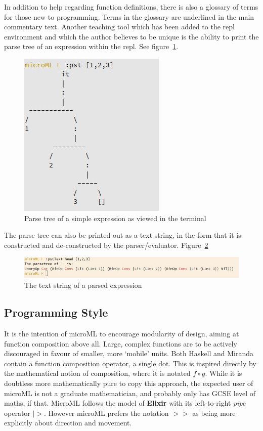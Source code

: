 \documentclass[12pt, a4paper]{report}
\begin{document}
In addition to help regarding function definitions, there is also a glossary of terms for those new
to programming. Terms in the glossary are underlined in the main commentary text.  Another teaching 
tool which has been added to the repl environment and which the author believes to be unique
is the ability to print the parse tree of an expression within the repl. See figure~\ref{fig:tree}.

\begin{figure}
    \includegraphics[scale=0.6]{images/tree.jpg}
    {\caption{Parse tree of a simple expression as viewed in the terminal}}
\label{fig:tree}
\end{figure}

The parse tree can also be printed out as a text string, in the form that it is constructed and
de-constructed by the parser/evaluator. Figure~\ref{fig:parsetext}

\begin{figure}
    \includegraphics[width=\textwidth]{images/parsetext.jpg}
    {\caption{The text string of a parsed expression}}
    \label{fig:parsetext}
\end{figure}

\subsection{Programming Style}
It is the intention of microML to encourage modularity of design, aiming at function composition
above all. Large, complex functions are to be actively discouraged in favour of smaller, more
`mobile' units. Both Haskell and Miranda contain a function composition operator, a single dot.
This is inspired directly by the mathematical notion of composition, where it is notated $ f \circ
g $. While it is doubtless more mathematically pure to copy this approach, the expected user of
microML is not a graduate mathematician, and probably only has GCSE level of maths, if that. MicroML
follows the model of \textbf{Elixir} with its left-to-right \textit{pipe} operator $|>$. However
microML prefers the notation $>>$ as being more explicitly about direction and movement.
\end{document}

